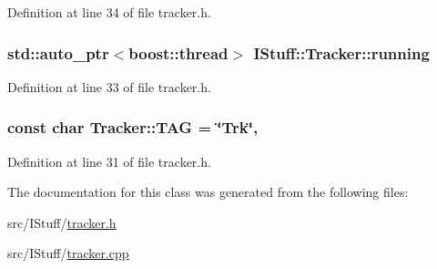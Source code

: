 Definition at line 34 of file tracker.\-h.

\hypertarget{class_i_stuff_1_1_tracker_aa7e9ed78659336011a3ac499be0674e9}{
\subsubsection[{running}]{\setlength{\rightskip}{0pt plus 5cm}std\-::auto\-\_\-ptr$<$boost\-::thread$>$ I\-Stuff\-::\-Tracker\-::running\hspace{0.3cm}{\ttfamily [private]}}}\label{class_i_stuff_1_1_tracker_aa7e9ed78659336011a3ac499be0674e9}


Definition at line 33 of file tracker.\-h.

\hypertarget{class_i_stuff_1_1_tracker_a68ef6bf09dbf9db7a6788ed899edb28d}{
\subsubsection[{T\-A\-G}]{\setlength{\rightskip}{0pt plus 5cm}const char Tracker\-::\-T\-A\-G = \char`\"{}Trk\char`\"{}\hspace{0.3cm}{\ttfamily [static]}, {\ttfamily [private]}}}\label{class_i_stuff_1_1_tracker_a68ef6bf09dbf9db7a6788ed899edb28d}


Definition at line 31 of file tracker.\-h.



The documentation for this class was generated from the following files\-:\begin{DoxyCompactItemize}
\item 
src/\-I\-Stuff/\hyperlink{tracker_8h}{tracker.\-h}\item 
src/\-I\-Stuff/\hyperlink{tracker_8cpp}{tracker.\-cpp}\end{DoxyCompactItemize}
